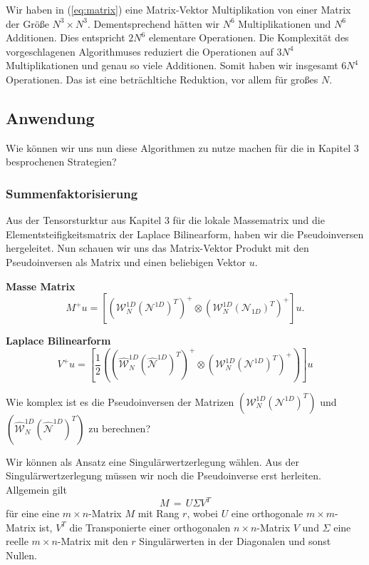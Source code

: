  
Wir haben in (\ref{eq:matrix}) eine Matrix-Vektor Multiplikation von einer Matrix der Größe $N^3 \times N^3$. Dementsprechend hätten wir $N^{6}$ Multiplikationen und $N^6$ Additionen. Dies entspricht $2N^6$ elementare Operationen. Die Komplexität des vorgeschlagenen Algorithmuses reduziert die Operationen auf $3N^{4}$ Multiplikationen und genau so viele Additionen. Somit haben wir insgesamt $6N^4$ Operationen. Das ist eine beträchltiche Reduktion, vor allem für großes $N$.
\newline

\newpage
\subsection{Anwendung}

Wie können wir uns nun diese Algorithmen zu nutze machen für die in Kapitel 3 besprochenen Strategien?

\subsubsection{Summenfaktorisierung}

Aus der Tensorsturktur aus Kapitel 3 für die lokale Massematrix und die Elementsteifigkeitsmatrix der Laplace Bilinearform, haben wir die Pseudoinversen hergeleitet. Nun schauen wir uns das Matrix-Vektor Produkt mit den Pseudoinversen als Matrix und einen beliebigen Vektor $u$.


\textbf{Masse Matrix} 
\begin{equation*}
M^{+}u =  [(\mathcal{W}_N^{1D} (\mathcal{N}^{1D})^T)^+ \otimes (\mathcal{W}_N^{1D} (\mathcal{N}_{1D})^T)^+]u.
\end{equation*}

\textbf{Laplace Bilinearform}
\begin{equation*}
V^{+}u =  [\dfrac{1}{2} ((\widehat{\mathcal{W}}_N^{1D} (\widehat{\mathcal{N}}^{1D})^T)^+ \otimes (\mathcal{W}_N^{1D} (\mathcal{N}^{1D})^T)^+)]u
\end{equation*}

Wie komplex ist es die Pseudoinversen der Matrizen $(\mathcal{W}_N^{1D} (\mathcal{N}^{1D})^T)$ und $(\widehat{\mathcal{W}}_N^{1D} (\widehat{\mathcal{N}}^{1D})^T)$ zu berechnen?

Wir können als Ansatz eine Singulärwertzerlegung wählen. Aus der Singulärwertzerlegung müssen wir noch die Pseudoinverse erst herleiten.
Allgemein gilt
\begin{equation*}
M\,=\,U\Sigma V^{T}
\end{equation*}
für eine eine $m \times n$-Matrix $M$ mit Rang $r$, wobei
$U$ eine orthogonale $m\times m$-Matrix ist, $V^{T}$ die Transponierte einer orthogonalen $n\times n$-Matrix $V$ und
$\Sigma$  eine reelle  $m\times n$-Matrix mit den $r$ Singulärwerten in der Diagonalen und sonst Nullen.


